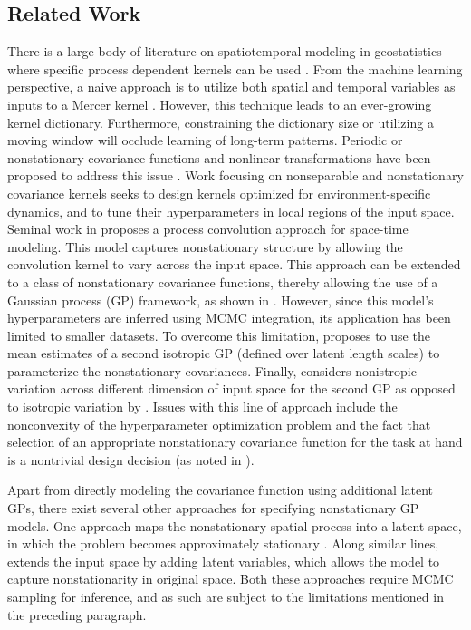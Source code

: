 \subsection{Related Work}\label{sec:related}
There is a large body of literature on spatiotemporal modeling in geostatistics where specific process dependent kernels can be used \cite{wikle2002kernel,cressie2011statistics}. From the machine learning perspective, a naive approach is to utilize both spatial and temporal variables as inputs to a Mercer kernel \cite{perez2013gaussian}. However, this technique leads to an ever-growing kernel dictionary. %
Furthermore, constraining the dictionary size or utilizing a moving window will
occlude learning of long-term patterns. Periodic or nonstationary covariance functions and nonlinear transformations have been proposed to address this issue \cite{ma2003nonstationary,RasmussenWilliams2005}. Work focusing on nonseparable and nonstationary covariance kernels seeks to design kernels optimized for environment-specific dynamics, and to tune their hyperparameters in local regions of the input space. Seminal work in \cite{higdon1998process} proposes a process convolution approach for space-time modeling. This model captures nonstationary structure by allowing the convolution kernel to vary across the input space. This approach can be extended to a class of nonstationary covariance functions, thereby allowing the use of a Gaussian process (GP) framework, as shown in \cite{paciorek2004nonstationary}. However,  since this model's hyperparameters are inferred using MCMC integration, its application has been limited to smaller datasets. To overcome this limitation, \cite{plagemann2008nonstationary} proposes to use the mean estimates of a second isotropic GP (defined over latent length scales) to parameterize the nonstationary covariances. Finally, \cite{garg2012AAAI} considers nonistropic variation across different dimension of input space for the second GP as opposed to isotropic variation by \cite{plagemann2008nonstationary}. Issues with this line of approach include the nonconvexity of the hyperparameter optimization problem and the fact that selection of an appropriate nonstationary covariance function for the task at hand is a nontrivial design decision (as noted in \cite{singh2010modeling}). 

Apart from directly modeling the covariance function using additional latent GPs, there exist several other approaches for specifying nonstationary GP models. One approach maps the nonstationary spatial process into a latent space, in which the problem becomes approximately stationary \cite{schmidt2003bayesian}. Along similar lines, \cite{pfingsten2006nonstationary} extends the input space by adding latent variables, which allows the model to capture  nonstationarity in original space. Both these approaches require MCMC sampling for inference, and as such are subject to the limitations mentioned in the preceding paragraph. 


